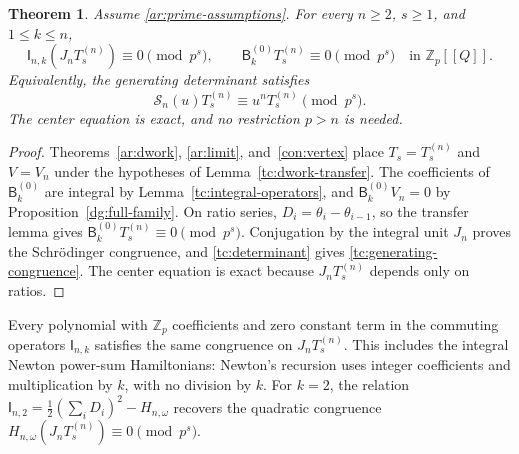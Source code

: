 \documentclass[11pt]{amsart}
\newtheorem{theorem}{Theorem}[section]
\theoremstyle{definition}
\theoremstyle{remark}
\numberwithin{equation}{section}
\newcommand{\Z}{\mathbb Z}
\begin{document}
\begin{theorem}\label{tc:full-congruence}\label{tc:quadratic-congruence}
Assume \eqref{ar:prime-assumptions}. For every $n\geq2$,
$s\geq1$, and $1\leq k\leq n$,
\begin{equation}\label{tc:full-congruence-system}
 \mathsf I_{n,k}(J_nT_s^{(n)})\equiv0\pmod{p^s},\qquad
 \mathsf B_k^{(0)}T_s^{(n)}\equiv0\pmod{p^s}
 \quad\text{in }\Z_p[[Q]].
\end{equation}
Equivalently, the generating determinant satisfies
\begin{equation}\label{tc:generating-congruence}
 \mathscr S_n(u)T_s^{(n)}\equiv u^nT_s^{(n)}\pmod{p^s}.
\end{equation}
The center equation is exact, and no restriction $p>n$ is needed.
\end{theorem}

\begin{proof}
Theorems~\ref{ar:dwork}, \ref{ar:limit}, and~\ref{con:vertex}
place $T_s=T_s^{(n)}$ and $V=V_n$ under the hypotheses of
Lemma~\ref{tc:dwork-transfer}. The coefficients of
$\mathsf B_k^{(0)}$ are integral by
Lemma~\ref{tc:integral-operators}, and
$\mathsf B_k^{(0)}V_n=0$ by
Proposition~\ref{dg:full-family}. On ratio series,
$D_i=\theta_i-\theta_{i-1}$, so the transfer lemma gives
$\mathsf B_k^{(0)}T_s^{(n)}\equiv0\pmod{p^s}$.
Conjugation by the integral unit $J_n$ proves the
Schr\"odinger congruence, and \eqref{tc:determinant} gives
\eqref{tc:generating-congruence}. The center equation is exact
because $J_nT_s^{(n)}$ depends only on ratios.

\end{proof}

Every polynomial with $\Z_p$ coefficients and zero constant term
in the commuting operators $\mathsf I_{n,k}$ satisfies the same
congruence on $J_nT_s^{(n)}$. This includes the integral Newton
power-sum Hamiltonians: Newton's recursion uses integer
coefficients and multiplication by $k$, with no division by $k$.
For $k=2$, the relation
$\mathsf I_{n,2}=\frac12(\sum_iD_i)^2-H_{n,\omega}$ recovers
the quadratic congruence
$H_{n,\omega}(J_nT_s^{(n)})\equiv0\pmod{p^s}$.
\end{document}
